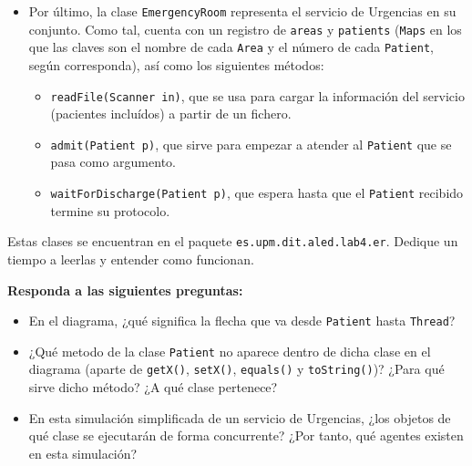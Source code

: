 \documentclass[10pt,a4paper,spanish]{article}
\newcommand{\code}[1]{\texttt{#1}}
\begin{document}
\begin{itemize}
    Fíjese además en que la clase \code{Patient} también tiene dos métodos:
    \begin{itemize}
        \item \code{advanceProtocol()}, que hace que el paciente avance al siguiente paso en el protocolo.
        \item \code{attendAtLocation()}, que hace que el paciente espere en el \code{Area} en la que se encuentra el tiempo que esta última determine.
    \end{itemize}
    \item Por último, la clase \code{EmergencyRoom} representa el servicio de Urgencias en su conjunto. Como tal, cuenta con un registro de \code{areas} y \code{patients} (\code{Maps} en los que las claves son el nombre de cada \code{Area} y el número de cada \code{Patient}, según corresponda), así como los siguientes métodos:
    \begin{itemize}
        \item \code{readFile(Scanner in)}, que se usa para cargar la información del servicio (pacientes incluídos) a partir de un fichero.
        \item \code{admit(Patient p)}, que sirve para empezar a atender al \code{Patient} que se pasa como argumento.
        \item \code{waitForDischarge(Patient p)}, que espera hasta que el \code{Patient} recibido termine su protocolo.
    \end{itemize}
\end{itemize}

Estas clases se encuentran en el paquete \code{es.upm.dit.aled.lab4.er}. Dedique un tiempo a leerlas y entender como funcionan.

\textbf{Responda a las siguientes preguntas:}

\begin{itemize}
    \item En el diagrama, ¿qué significa la flecha que va desde \code{Patient} hasta \code{Thread}?
    \item ¿Qué metodo de la clase \code{Patient} no aparece dentro de dicha clase en el diagrama (aparte de \code{getX()}, \code{setX()}, \code{equals()} y \code{toString()})? ¿Para qué sirve dicho método? ¿A qué clase pertenece?
    \item En esta simulación simplificada de un servicio de Urgencias, ¿los objetos de qué clase se ejecutarán de forma concurrente? ¿Por tanto, qué agentes existen en esta simulación?
\end{itemize}
\end{document}

